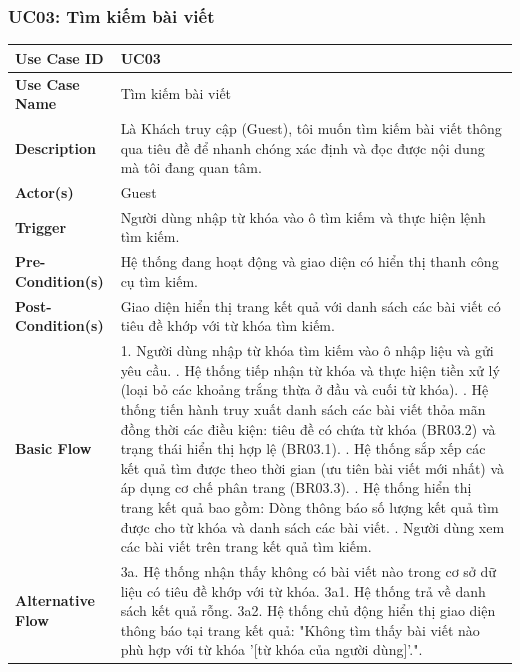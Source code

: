 \documentclass[a4paper,12pt]{article}
\begin{document}
\subsubsection{UC03: Tìm kiếm bài viết}
\begin{longtable}{|p{4cm}|p{11.5cm}|}
\hline
\textbf{Use Case ID} & UC03 \\ \hline
\textbf{Use Case Name} & Tìm kiếm bài viết \\ \hline
\textbf{Description} & Là Khách truy cập (Guest), tôi muốn tìm kiếm bài viết thông qua tiêu đề để nhanh chóng xác định và đọc được nội dung mà tôi đang quan tâm. \\ \hline
\textbf{Actor(s)} & Guest \\ \hline
\textbf{Trigger} & Người dùng nhập từ khóa vào ô tìm kiếm và thực hiện lệnh tìm kiếm. \\ \hline
\textbf{Pre-Condition(s)} & Hệ thống đang hoạt động và giao diện có hiển thị thanh công cụ tìm kiếm. \\ \hline
\textbf{Post-Condition(s)} & Giao diện hiển thị trang kết quả với danh sách các bài viết có tiêu đề khớp với từ khóa tìm kiếm. \\ \hline
\textbf{Basic Flow} & 
1. Người dùng nhập từ khóa tìm kiếm vào ô nhập liệu và gửi yêu cầu. \newline
2. Hệ thống tiếp nhận từ khóa và thực hiện tiền xử lý (loại bỏ các khoảng trắng thừa ở đầu và cuối từ khóa). \newline
3. Hệ thống tiến hành truy xuất danh sách các bài viết thỏa mãn đồng thời các điều kiện: tiêu đề có chứa từ khóa (BR03.2) và trạng thái hiển thị hợp lệ (BR03.1). \newline
4. Hệ thống sắp xếp các kết quả tìm được theo thời gian (ưu tiên bài viết mới nhất) và áp dụng cơ chế phân trang (BR03.3). \newline
5. Hệ thống hiển thị trang kết quả bao gồm: Dòng thông báo số lượng kết quả tìm được cho từ khóa và danh sách các bài viết. \newline
6. Người dùng xem các bài viết trên trang kết quả tìm kiếm. \\ \hline
\textbf{Alternative Flow} & 
3a. Hệ thống nhận thấy không có bài viết nào trong cơ sở dữ liệu có tiêu đề khớp với từ khóa. \newline
3a1. Hệ thống trả về danh sách kết quả rỗng. \newline
3a2. Hệ thống chủ động hiển thị giao diện thông báo tại trang kết quả: "Không tìm thấy bài viết nào phù hợp với từ khóa '[từ khóa của người dùng]'.". \newline

\end{longtable}
\end{document}
